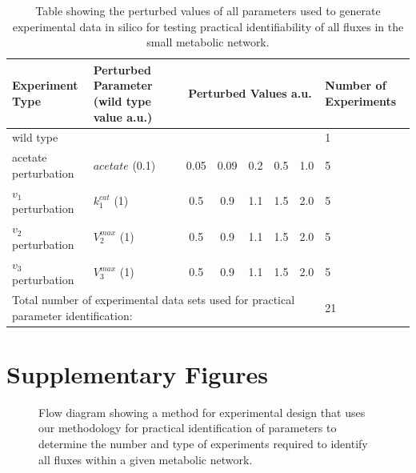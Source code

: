 \documentclass[10pt]{article}
\begin{document}
\begin{table}[!thbp]
	\caption{Table showing the perturbed values of all parameters used to generate experimental data in silico for testing practical identifiability of all fluxes in the small metabolic network.}
	\begin{center}				
		\begin{tabular}{lp{3.5cm}cccccp{2cm}}
			\hline
			Experiment Type & Perturbed Parameter (wild type value a.u.)& \multicolumn{5}{c}{Perturbed Values a.u.} & Number of Experiments\\
			\hline
			wild type &  &\multicolumn{5}{l}{} & 1\\
			acetate perturbation & $acetate$ (0.1) & 0.05 & 0.09 & 0.2 & 0.5 & 1.0 & 5\\
			$v_1$ perturbation & $k_1^{cat}$ (1) & 0.5 & 0.9 & 1.1 & 1.5 & 2.0 & 5\\				
			$v_2$ perturbation & $V_2^{max}$ (1) & 0.5 & 0.9 & 1.1 & 1.5 & 2.0 & 5\\								
			$v_3$ perturbation & $V_3^{max}$ (1) & 0.5 & 0.9 & 1.1 & 1.5 & 2.0 & 5\\
			\hline
			\multicolumn{7}{l}{Total number of experimental data sets used for practical parameter identification:} & 21\\
			\hline
		\end{tabular}
	\end{center}	
	\label{tab:pval}
\end{table}	

\clearpage

\section{Supplementary Figures}	
\begin{figure}[!tbhp]
	\caption{Flow diagram showing a method for experimental design that uses our methodology for practical identification of parameters to determine the number and type of experiments required to identify all fluxes within a given metabolic network.}\label{fig:ident-design}
\end{figure}
\end{document}
